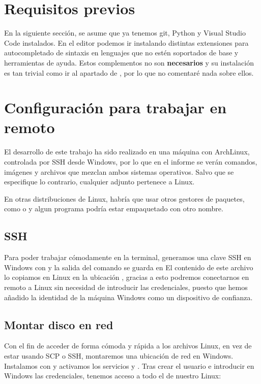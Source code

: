 \section{Requisitos previos}
En la siguiente sección, se asume que ya tenemos git\cite{git}, Python\cite{python} y Visual Studio Code\cite{vscode} instalados. En el editor podemos ir instalando distintas extensiones para autocompletado de sintaxis en lenguajes que no estén soportados de base y herramientas de ayuda. Estos complementos no son \textbf{necesarios} y su instalación es tan trivial como ir al apartado de , por lo que no comentaré nada sobre ellos.

\section{Configuración para trabajar en remoto}
El desarrollo de este trabajo ha sido realizado en una máquina con ArchLinux\cite{arch}, controlada por SSH\cite{SSH} desde Windows, por lo que en el informe se verán comandos, imágenes y archivos que mezclan ambos sistemas operativos. Salvo que se especifique lo contrario, cualquier adjunto pertenece a Linux. \par
\hr
En otras distribuciones de Linux, habría que usar otros gestores de paquetes, como  o  y algun programa podría estar empaquetado con otro nombre.
\hr

  \subsection{SSH}
  Para poder trabajar cómodamente en la terminal, generamos una clave SSH en Windows con  y la salida del comando se guarda en  \newline
  El contenido de este archivo lo copiamos en Linux en la ubicación , gracias a esto podremos conectarnos en remoto a Linux sin necesidad de introducir las credenciales, puesto que hemos añadido la identidad de la máquina Windows como un dispositivo de confianza.

  \subsection{Montar disco en red}
  Con el fin de acceder de forma cómoda y rápida a los archivos Linux, en vez de estar usando SCP\cite{scp} o SSH, montaremos una ubicación de red en Windows. Instalamos con  y activamos los servicios  y . Tras crear el usuario e introducir en Windows las credenciales, tenemos acceso a todo el  de nuestro Linux:

